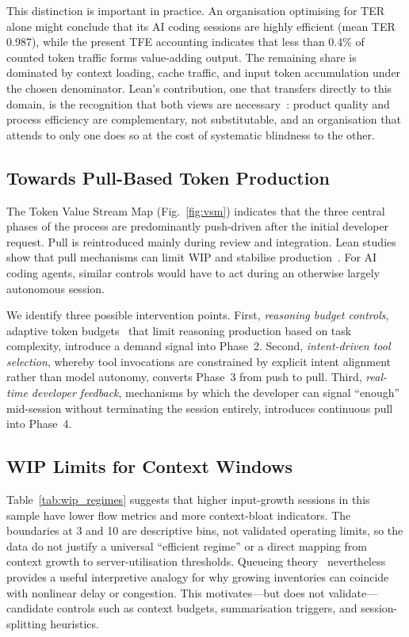 \documentclass[journal]{IEEEtran}
\begin{document}
This distinction is important in practice. An organisation optimising for TER alone might conclude that its AI coding sessions are highly efficient (mean TER 0.987), while the present TFE accounting indicates that less than 0.4\% of counted token traffic forms value-adding output. The remaining share is dominated by context loading, cache traffic, and input token accumulation under the chosen denominator. Lean's contribution, one that transfers directly to this domain, is the recognition that both views are necessary~\cite{womack1996}: product quality and process efficiency are complementary, not substitutable, and an organisation that attends to only one does so at the cost of systematic blindness to the other.

\subsection{Towards Pull-Based Token Production}

The Token Value Stream Map (Fig.~\ref{fig:vsm}) indicates that the three central phases of the process are predominantly push-driven after the initial developer request. Pull is reintroduced mainly during review and integration. Lean studies show that pull mechanisms can limit WIP and stabilise production~\cite{hopp2004, anderson2010}. For AI coding agents, similar controls would have to act during an otherwise largely autonomous session.

We identify three possible intervention points. First, \emph{reasoning budget controls}, adaptive token budgets~\cite{selfbudgeter2025, tale2024, routetoreason2025} that limit reasoning production based on task complexity, introduce a demand signal into Phase~2. Second, \emph{intent-driven tool selection}, whereby tool invocations are constrained by explicit intent alignment rather than model autonomy, converts Phase~3 from push to pull. Third, \emph{real-time developer feedback}, mechanisms by which the developer can signal ``enough'' mid-session without terminating the session entirely, introduces continuous pull into Phase~4.

\subsection{WIP Limits for Context Windows}

Table~\ref{tab:wip_regimes} suggests that higher input-growth sessions in this sample have lower flow metrics and more context-bloat indicators. The boundaries at 3 and 10 are descriptive bins, not validated operating limits, so the data do not justify a universal ``efficient regime'' or a direct mapping from context growth to server-utilisation thresholds. Queueing theory~\cite{kleinrock1975} nevertheless provides a useful interpretive analogy for why growing inventories can coincide with nonlinear delay or congestion. This motivates---but does not validate---candidate controls such as context budgets, summarisation triggers, and session-splitting heuristics.
\end{document}

